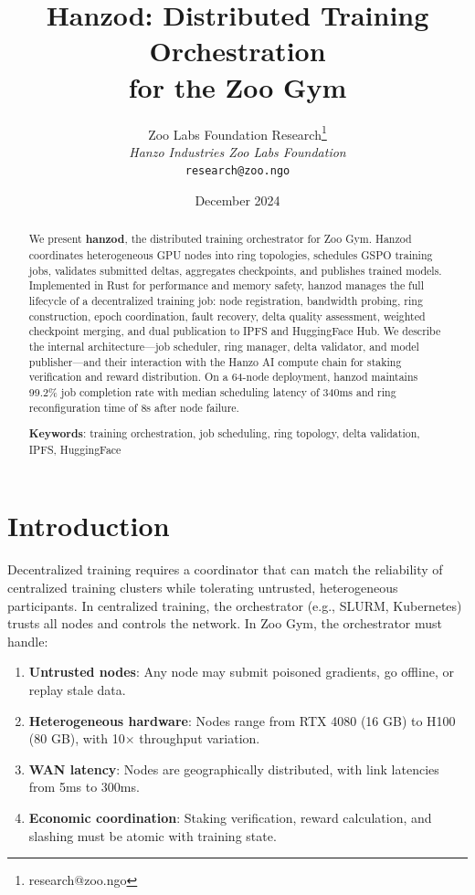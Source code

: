 \documentclass[11pt,letterpaper]{article}
\title{\textbf{Hanzod: Distributed Training Orchestration\\for the Zoo Gym}}
\author{
Zoo Labs Foundation Research\thanks{research@zoo.ngo}\\
\textit{Hanzo Industries \quad Zoo Labs Foundation}\\
\texttt{research@zoo.ngo}
}
\date{December 2024}
\begin{document}
\zoocoverpage

\begin{abstract}
We present \textbf{hanzod}, the distributed training orchestrator for Zoo Gym.  Hanzod coordinates heterogeneous GPU nodes into ring topologies, schedules GSPO training jobs, validates submitted deltas, aggregates checkpoints, and publishes trained models.  Implemented in Rust for performance and memory safety, hanzod manages the full lifecycle of a decentralized training job: node registration, bandwidth probing, ring construction, epoch coordination, fault recovery, delta quality assessment, weighted checkpoint merging, and dual publication to IPFS and HuggingFace Hub.  We describe the internal architecture---job scheduler, ring manager, delta validator, and model publisher---and their interaction with the Hanzo AI compute chain for staking verification and reward distribution.  On a 64-node deployment, hanzod maintains 99.2\% job completion rate with median scheduling latency of 340ms and ring reconfiguration time of 8s after node failure.

\textbf{Keywords}: training orchestration, job scheduling, ring topology, delta validation, IPFS, HuggingFace
\end{abstract}

\section{Introduction}

Decentralized training requires a coordinator that can match the reliability of centralized training clusters while tolerating untrusted, heterogeneous participants.  In centralized training, the orchestrator (e.g., SLURM, Kubernetes) trusts all nodes and controls the network.  In Zoo Gym, the orchestrator must handle:

\begin{enumerate}
    \item \textbf{Untrusted nodes}: Any node may submit poisoned gradients, go offline, or replay stale data.
    \item \textbf{Heterogeneous hardware}: Nodes range from RTX 4080 (16 GB) to H100 (80 GB), with 10$\times$ throughput variation.
    \item \textbf{WAN latency}: Nodes are geographically distributed, with link latencies from 5ms to 300ms.
    \item \textbf{Economic coordination}: Staking verification, reward calculation, and slashing must be atomic with training state.
\end{enumerate}
\end{document}
